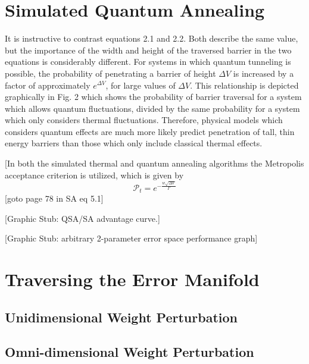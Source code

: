 \documentclass[11pt]{afthesis}
\begin{document}
	\section{Simulated Quantum Annealing}
	
	It is instructive to contrast equations 2.1 and 2.2. Both describe the same value, but the importance of the width and height of the traversed barrier in the two equations is considerably different. For systems in which quantum tunneling is possible, the probability of penetrating a barrier of height \begin{math} \Delta V \end{math} is increased by a factor of approximately \begin{math} e^{\Delta V} \end{math}, for large values of \begin{math} \Delta V \end{math}. This relationship is depicted graphically in Fig. 2 which shows the probability of barrier traversal for a system which allows quantum fluctuations, divided by the same probability for a system which only considers thermal fluctuations. Therefore, physical models which considers quantum effects are much more likely predict penetration of tall, thin energy barriers than those which only include classical thermal effects.
	
	[In both the simulated thermal and quantum annealing algorithms the Metropolis acceptance criterion is utilized, which is given by \begin{equation}
	\mathcal{P}_t = e^{-\frac{w \sqrt{\Delta V}}{ \Gamma}} 
	\end{equation}[goto page 78 in SA eq 5.1] 
	
	
	[Graphic Stub: QSA/SA advantage curve.] 
	
	[Graphic Stub: arbitrary 2-parameter error space performance graph]
	
	\section{Traversing the Error Manifold}
	
	\subsection{Unidimensional Weight Perturbation}
	
	\subsection{Omni-dimensional Weight Perturbation}
	
\end{document}
